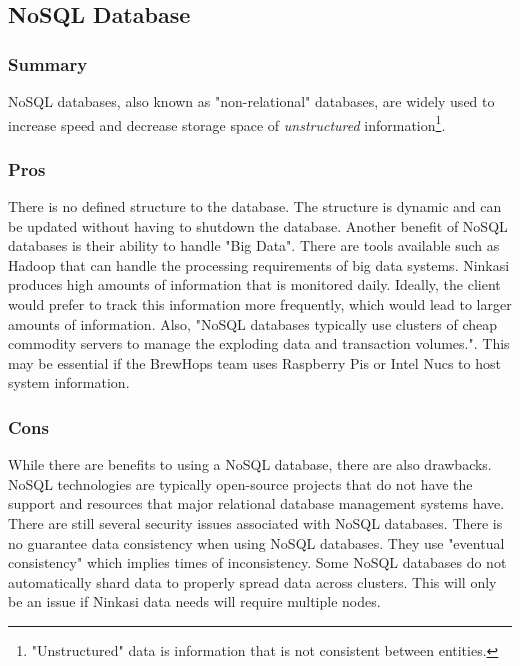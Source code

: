 \documentclass[draftclsnofoot,onecolumn,letterpaper,10pt,compsoc]{IEEEtran}
\begin{document}
			\subsection{NoSQL Database}
		        \subsubsection{Summary}
		            NoSQL databases, also known as "non-relational" databases, are widely used to increase speed and decrease storage space of \textit{unstructured} information\footnote{"Unstructured" data is information that is not consistent between entities.}.

		        \subsubsection{Pros}
		            There is no defined structure to the database.
		            The structure is dynamic and can be updated without having to shutdown the database\cite{MongoDBProsCons}.
		            Another benefit of NoSQL databases is their ability to handle "Big Data".
		            There are tools available such as Hadoop that can handle the processing requirements of big data systems\cite{NoSQLProsCons}.
		            Ninkasi produces high amounts of information that is monitored daily.
		            Ideally, the client would prefer to track this information more frequently, which would lead to larger amounts of information.
		            Also, "NoSQL databases typically use clusters of cheap commodity servers to manage the exploding data and transaction volumes."\cite{NoSQLProsCons}.
		            This may be essential if the BrewHops team uses Raspberry Pis or Intel Nucs to host system information.


		        \subsubsection{Cons}
		            While there are benefits to using a NoSQL database, there are also drawbacks.
		            NoSQL technologies are typically open-source projects that do not have the support and resources that major relational database management systems have\cite{NoSQLProsCons}.
		            There are still several security issues associated with NoSQL databases\cite{NoSQLSecurityIssues}.
		            There is no guarantee data consistency when using NoSQL databases\cite{ChannelFutures}.
		            They use "eventual consistency" which implies times of inconsistency.
		            Some NoSQL databases do not automatically shard data to properly spread data across clusters\cite{ChannelFutures}.
		            This will only be an issue if Ninkasi data needs will require multiple nodes.
\end{document}
